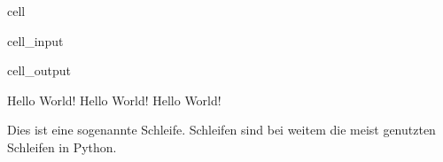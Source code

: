 \documentclass[letterpaper,10pt,english]{jupyterBook}
\begin{document}
\begin{sphinxuseclass}{cell}\begin{sphinxVerbatimInput}

\begin{sphinxuseclass}{cell_input}
\begin{sphinxVerbatim}[commandchars=\\\{\}]
 
       

\end{sphinxVerbatim}

\end{sphinxuseclass}\end{sphinxVerbatimInput}
\begin{sphinxVerbatimOutput}

\begin{sphinxuseclass}{cell_output}
\begin{sphinxVerbatim}[commandchars=\\\{\}]
Hello World!
Hello World!
Hello World!
\end{sphinxVerbatim}

\end{sphinxuseclass}\end{sphinxVerbatimOutput}

\end{sphinxuseclass}
\sphinxAtStartPar
Dies ist eine sogenannte \sphinxhyphen{}Schleife. \sphinxhyphen{}Schleifen sind bei weitem die meist genutzten Schleifen in Python.
\end{document}

